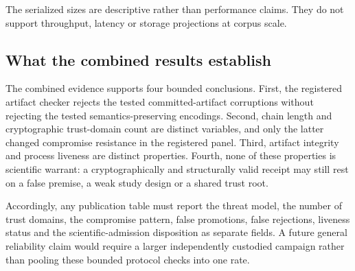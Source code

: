 The serialized sizes are descriptive rather than performance claims. They do not
support throughput, latency or storage projections at corpus scale.

\subsection{What the combined results establish}

The combined evidence supports four bounded conclusions. First, the registered
artifact checker rejects the tested committed-artifact corruptions without rejecting
the tested semantics-preserving encodings. Second, chain length and cryptographic
trust-domain count are distinct variables, and only the latter changed compromise
resistance in the registered panel. Third, artifact integrity and process liveness
are distinct properties. Fourth, none of these properties is scientific warrant:
a cryptographically and structurally valid receipt may still rest on a false premise,
a weak study design or a shared trust root.

Accordingly, any publication table must report the threat model, the number of trust
domains, the compromise pattern, false promotions, false rejections, liveness status
and the scientific-admission disposition as separate fields. A future general
reliability claim would require a larger independently custodied campaign rather than
pooling these bounded protocol checks into one rate.
